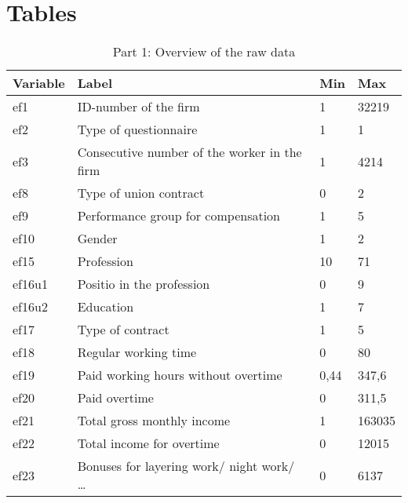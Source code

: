 \section{Tables}

\begin{table}[H]
\centering
\caption{Part 1: Overview of the raw data}
\label{raw1}
\begin{tabular}{|l|l|l|l|}
\hline
\textbf{Variable} & \textbf{Label}                                               & \textbf{Min}  & \textbf{Max}    \\ \hline
ef1      & ID-number of the firm                               & 1    & 32219  \\ \hline
ef2      & Type of questionnaire                               & 1    & 1      \\ \hline
ef3      & Consecutive number of the worker in the firm        & 1    & 4214   \\ \hline
ef8      & Type of union contract                              & 0    & 2      \\ \hline
ef9      & Performance group for compensation                  & 1    & 5      \\ \hline
ef10     & Gender                                              & 1    & 2      \\ \hline
ef15     & Profession                                          & 10   & 71     \\ \hline
ef16u1   & Positio in the profession                           & 0    & 9      \\ \hline
ef16u2   & Education                                           & 1    & 7      \\ \hline
ef17     & Type of contract                                    & 1    & 5      \\ \hline
ef18     & Regular working time                                & 0    & 80     \\ \hline
ef19     & Paid working hours without overtime                 & 0,44 & 347,6  \\ \hline
ef20     & Paid overtime                                       & 0    & 311,5  \\ \hline
ef21     & Total gross monthly income                          & 1    & 163035 \\ \hline
ef22     & Total income for overtime                           & 0    & 12015  \\ \hline
ef23     & Bonuses for layering work/ night work/ …            & 0    & 6137   \\ \hline

\end{tabular}
\end{table}
